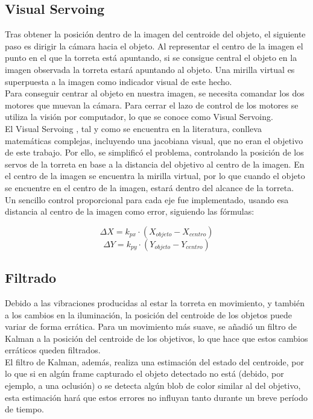 \subsection{Visual Servoing}
Tras obtener la posición dentro de la imagen del centroide del objeto, el siguiente paso es dirigir la cámara hacia el objeto. Al representar el centro de la imagen el punto en el que la torreta está apuntando, si se consigue central el objeto en la imagen observada la torreta estará apuntando al objeto. Una mirilla virtual es superpuesta a la imagen como indicador visual de este hecho.\\

Para conseguir centrar al objeto en nuestra imagen, se necesita comandar los dos motores que muevan la cámara. Para cerrar el lazo de control de los motores se utiliza la visión por computador, lo que se conoce como Visual Servoing.\\

El Visual Servoing , tal y como se encuentra en la literatura, conlleva matemáticas complejas, incluyendo una jacobiana visual, que no eran el objetivo de este trabajo. Por ello, se simplificó el problema, controlando la posición de los servos de la torreta en base a la distancia del objetivo al centro de la imagen. En el centro de la imagen se encuentra la mirilla virtual, por lo que cuando el objeto se encuentre en el centro de la imagen, estará dentro del alcance de la torreta.\\

Un sencillo control proporcional para cada eje fue implementado, usando esa distancia al centro de la imagen como error, siguiendo las fórmulas:

\[\Delta X=k_{px} \cdot (X_{objeto}-X_{centro})\] 
\[\Delta Y=k_{py} \cdot (Y_{objeto}-Y_{centro})\]

\subsection{Filtrado}
Debido a las vibraciones producidas al estar la torreta en movimiento, y también a los cambios en la iluminación, la posición del centroide de los objetos puede variar de forma errática. Para un movimiento más suave, se añadió un filtro de Kalman a la posición del centroide de los objetivos, lo que hace que estos cambios erráticos queden filtrados.\\

El filtro de Kalman, además, realiza una estimación del estado del centroide, por lo que si en algún frame capturado el objeto detectado no está (debido, por ejemplo, a una oclusión) o se detecta algún blob de color similar al del objetivo, esta estimación hará que estos errores no influyan tanto durante un breve período de tiempo.\\

